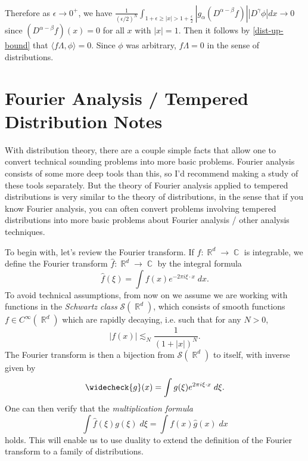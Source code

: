 \documentclass{exam}
\DeclareMathOperator{\CC}{\mathbb{C}}
\DeclareMathOperator{\RR}{\mathbb{R}}
\theoremstyle{problemstyle}
\newcommand{\1}[1]{\textbf{1}_{\left[#1\right]}} %
\begin{document}
\begin{questions}
\begin{parts}
\begin{solution}
\begin{align*}
    \end{align*}
    Therefore as $\epsilon\to 0^+$, we have $\frac{1}{(\epsilon/2)^N}\int_{1+ \epsilon\geq |x|>1+\frac{\epsilon}{2}} \left| g_{\alpha}(D^{\alpha-\beta}f)\right| \left| D^{\gamma}\phi \right|dx \to 0$ since $(D^{\alpha-\beta}f)(x)=0$ for all $x$ with $|x|=1$. Then it follows by \eqref{dist-up-bound} that $\langle f\Lambda, \phi\rangle = 0$. Since $\phi$ was arbitrary, $f\Lambda=0$ in the sense of distributions.
  \end{solution}
\end{parts}













\newpage
\section{Fourier Analysis / Tempered Distribution Notes}

With distribution theory, there are a couple simple facts that allow one to convert technical sounding problems into more basic problems. Fourier analysis consists of some more deep tools than this, so I'd recommend making a study of these tools separately. But the theory of Fourier analysis applied to tempered distributions is very similar to the theory of distributions, in the sense that if you know Fourier analysis, you can often convert problems involving tempered distributions into more basic problems about Fourier analysis / other analysis techniques.

To begin with, let's review the Fourier transform. If $f: \RR^d \to \CC$ is integrable, we define the Fourier transform $\widehat{f}: \RR^d \to \CC$ by the integral formula
%
\[ \widehat{f}(\xi) = \int f(x) e^{-2 \pi i \xi \cdot x}\; dx. \]
%
To avoid technical assumptions, from now on we assume we are working with functions in the \emph{Schwartz class} $\mathcal{S}(\RR^d)$, which consists of smooth functions $f \in C^\infty(\RR^d)$ which are rapidly decaying, i.e. such that for any $N > 0$,
%
\[ |f(x)| \lesssim_N \frac{1}{(1 + |x|)^N}. \]
%
The Fourier transform is then a bijection from $\mathcal{S}(\RR^d)$ to itself, with inverse given by
%
\[ \widecheck{g}(x) = \int g(\xi) e^{2 \pi i \xi \cdot x}\; d \xi. \]
%
One can then verify that the \emph{multiplication formula}
%
\[ \int \widehat{f}(\xi) g(\xi)\; d\xi = \int f(x) \widehat{g}(x)\; dx \]
%
holds. This will enable us to use duality to extend the definition of the Fourier transform to a family of distributions.


\end{questions}
\end{document}
